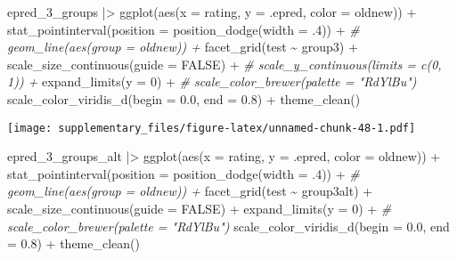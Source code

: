 \documentclass[
  man,floatsintext]{apa7}
\newenvironment{Shaded}{\begin{snugshade}}{\end{snugshade}}
\newcommand{\AttributeTok}[1]{\textcolor[rgb]{0.77,0.63,0.00}{#1}}
\newcommand{\CommentTok}[1]{\textcolor[rgb]{0.56,0.35,0.01}{\textit{#1}}}
\newcommand{\ConstantTok}[1]{\textcolor[rgb]{0.00,0.00,0.00}{#1}}
\newcommand{\DecValTok}[1]{\textcolor[rgb]{0.00,0.00,0.81}{#1}}
\newcommand{\FloatTok}[1]{\textcolor[rgb]{0.00,0.00,0.81}{#1}}
\newcommand{\FunctionTok}[1]{\textcolor[rgb]{0.00,0.00,0.00}{#1}}
\newcommand{\NormalTok}[1]{#1}
\newcommand{\SpecialCharTok}[1]{\textcolor[rgb]{0.00,0.00,0.00}{#1}}
\begin{document}
\begin{Shaded}
\begin{Highlighting}[]
\NormalTok{epred\_3\_groups }\SpecialCharTok{|\textgreater{}}
  \FunctionTok{ggplot}\NormalTok{(}\FunctionTok{aes}\NormalTok{(}\AttributeTok{x =}\NormalTok{ rating, }\AttributeTok{y =}\NormalTok{ .epred, }\AttributeTok{color =}\NormalTok{ oldnew)) }\SpecialCharTok{+}
  \FunctionTok{stat\_pointinterval}\NormalTok{(}\AttributeTok{position =} \FunctionTok{position\_dodge}\NormalTok{(}\AttributeTok{width =}\NormalTok{ .}\DecValTok{4}\NormalTok{)) }\SpecialCharTok{+}
  \CommentTok{\# geom\_line(aes(group = oldnew)) +}
  \FunctionTok{facet\_grid}\NormalTok{(test }\SpecialCharTok{\textasciitilde{}}\NormalTok{ group3) }\SpecialCharTok{+}
  \FunctionTok{scale\_size\_continuous}\NormalTok{(}\AttributeTok{guide =} \ConstantTok{FALSE}\NormalTok{) }\SpecialCharTok{+}
  \CommentTok{\# scale\_y\_continuous(limits = c(0, 1)) +}
  \FunctionTok{expand\_limits}\NormalTok{(}\AttributeTok{y =} \DecValTok{0}\NormalTok{) }\SpecialCharTok{+}
  \CommentTok{\# scale\_color\_brewer(palette = "RdYlBu")}
  \FunctionTok{scale\_color\_viridis\_d}\NormalTok{(}\AttributeTok{begin =} \FloatTok{0.0}\NormalTok{, }\AttributeTok{end =} \FloatTok{0.8}\NormalTok{) }\SpecialCharTok{+}
  \FunctionTok{theme\_clean}\NormalTok{()}
\end{Highlighting}
\end{Shaded}

\texttt{[image: supplementary\_files/figure-latex/unnamed-chunk-48-1.pdf]}

\begin{Shaded}
\begin{Highlighting}[]
\NormalTok{epred\_3\_groups\_alt }\SpecialCharTok{|\textgreater{}}
  \FunctionTok{ggplot}\NormalTok{(}\FunctionTok{aes}\NormalTok{(}\AttributeTok{x =}\NormalTok{ rating, }\AttributeTok{y =}\NormalTok{ .epred, }\AttributeTok{color =}\NormalTok{ oldnew)) }\SpecialCharTok{+}
  \FunctionTok{stat\_pointinterval}\NormalTok{(}\AttributeTok{position =} \FunctionTok{position\_dodge}\NormalTok{(}\AttributeTok{width =}\NormalTok{ .}\DecValTok{4}\NormalTok{)) }\SpecialCharTok{+}
  \CommentTok{\# geom\_line(aes(group = oldnew)) +}
  \FunctionTok{facet\_grid}\NormalTok{(test }\SpecialCharTok{\textasciitilde{}}\NormalTok{ group3alt) }\SpecialCharTok{+}
  \FunctionTok{scale\_size\_continuous}\NormalTok{(}\AttributeTok{guide =} \ConstantTok{FALSE}\NormalTok{) }\SpecialCharTok{+}
  \FunctionTok{expand\_limits}\NormalTok{(}\AttributeTok{y =} \DecValTok{0}\NormalTok{) }\SpecialCharTok{+}  
  \CommentTok{\# scale\_color\_brewer(palette = "RdYlBu")}
  \FunctionTok{scale\_color\_viridis\_d}\NormalTok{(}\AttributeTok{begin =} \FloatTok{0.0}\NormalTok{, }\AttributeTok{end =} \FloatTok{0.8}\NormalTok{) }\SpecialCharTok{+}
  \FunctionTok{theme\_clean}\NormalTok{()}
\end{Highlighting}
\end{Shaded}
\end{document}
